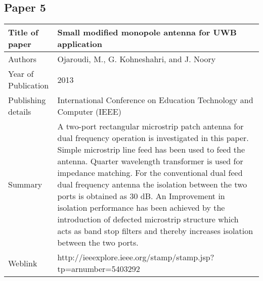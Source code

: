 \documentclass[12pt]{article}
\begin{document}
	   \subsection{Paper 5}
	    	\begin{table}[h]
	    		\centering
	    		\begin{tabular}{ |l|p{11cm}| }
	    			\hline
	    			Title of paper & Small modified monopole antenna for UWB application \\
	    			\hline
	    			Authors & Ojaroudi, M., G. Kohneshahri, and J. Noory \\
	    			\hline
	    			Year of Publication & 2013 \\
	    			\hline
	    			Publishing details & International Conference on Education Technology and Computer (IEEE) \\ \hline
	    			Summary & A two-port rectangular microstrip patch antenna for dual frequency operation is investigated in this paper. Simple microstrip line feed has been used to feed the antenna. Quarter wavelength transformer is used for impedance matching. For the conventional dual feed dual frequency antenna the isolation between the two ports is obtained as 30 dB. An Improvement in isolation performance has been achieved by the introduction of defected microstrip structure which acts as band stop filters and thereby increases isolation between the two ports.\\
	    			\hline
	    			Weblink & http://ieeexplore.ieee.org/stamp/stamp.jsp?tp=arnumber=5403292 \\
	    			\hline			 
	    		\end{tabular}		
	    		
	    	\end{table}
		
\end{document}
